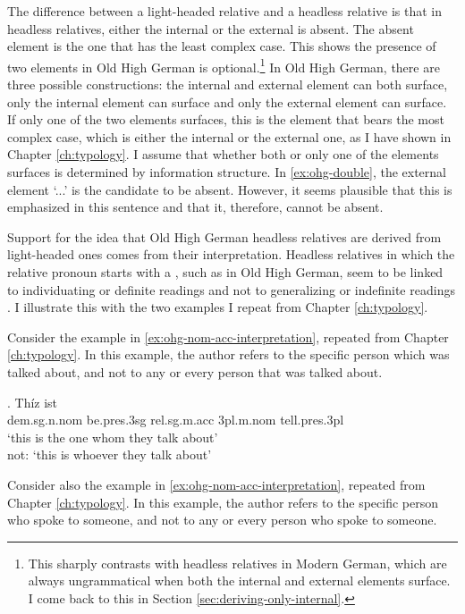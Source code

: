 The difference between a light-headed relative and a headless relative is that in headless relatives, either the internal or the external is absent. The absent element is the one that has the least complex case. This shows the presence of two elements in Old High German is optional.\footnote{
This sharply contrasts with headless relatives in Modern German, which are always ungrammatical when both the internal and external elements surface. I come back to this in Section \ref{sec:deriving-only-internal}.
}
In Old High German, there are three possible constructions: the internal and external element can both surface, only the internal element can surface and only the external element can surface. If only one of the two elements surfaces, this is the element that bears the most complex case, which is either the internal or the external one, as I have shown in Chapter \ref{ch:typology}. I assume that whether both or only one of the elements surfaces is determined by information structure. In \ref{ex:ohg-double}, the external element  `...' is the candidate to be absent. However, it seems plausible that this is emphasized in this sentence and that it, therefore, cannot be absent.

Support for the idea that Old High German headless relatives are derived from light-headed ones comes from their interpretation. Headless relatives in which the relative pronoun starts with a , such as in Old High German, seem to be linked to individuating or definite readings and not to generalizing or indefinite readings \citep[cf.][]{fuss2017}. I illustrate this with the two examples I repeat from Chapter  \ref{ch:typology}.

Consider the example in \ref{ex:ohg-nom-acc-interpretation}, repeated from Chapter \ref{ch:typology}.
In this example, the author refers to the specific person which was talked about, and not to any or every person that was talked about.

\exg. Thíz ist   \\
\ac{dem}.\ac{sg}.\ac{n}.\ac{nom} be.\ac{pres}.3\ac{sg}\scsub{[nom]} \ac{rel}.\ac{sg}.\ac{m}.\ac{acc}
3\ac{pl}.\ac{m}.\ac{nom} tell.\ac{pres}.3\ac{pl}\scsub{[acc]}\\
`this is the one whom they talk about'\\
not: `this is whoever they talk about' \label{ex:ohg-nom-acc-interpretation}

Consider also the example in \ref{ex:ohg-nom-acc-interpretation}, repeated from Chapter \ref{ch:typology}.
In this example, the author refers to the specific person who spoke to someone, and not to any or every person who spoke to someone.


